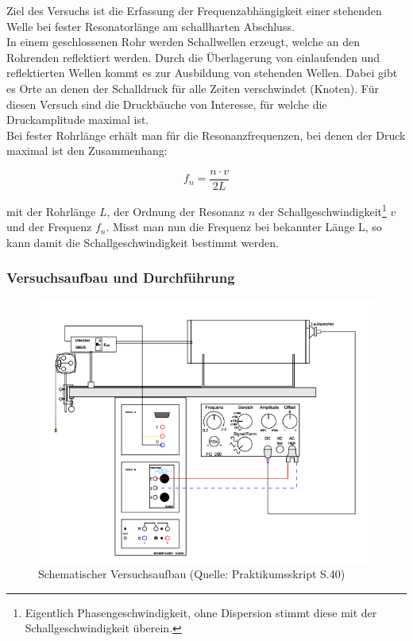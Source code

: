 \documentclass[12pt,a4paper]{article}
\begin{document}
Ziel des Versuchs ist die Erfassung der Frequenzabhängigkeit einer stehenden Welle bei fester Resonatorlänge am schallharten Abschluss.\\
In einem geschlossenen Rohr werden Schallwellen erzeugt, welche an den Rohrenden reflektiert werden. Durch die Überlagerung von einlaufenden und reflektierten Wellen kommt es zur Ausbildung von stehenden Wellen. Dabei gibt es Orte an denen der Schalldruck für alle Zeiten verschwindet (Knoten). Für diesen Versuch sind die Druckbäuche von Interesse, für welche die Druckamplitude maximal ist.\\
Bei fester Rohrlänge erhält man für die Resonanzfrequenzen, bei denen der Druck maximal ist den Zusammenhang:

\begin{equation}
f_n=\frac{n\cdot v}{2L}
\end{equation}

mit der Rohrlänge $L$, der Ordnung der Resonanz $n$ der Schallgeschwindigkeit\footnote{Eigentlich Phasengeschwindigkeit, ohne Dispersion stimmt diese mit der Schallgeschwindigkeit überein.}  $v$ und der Frequenz $f_n$.
Misst man nun die Frequenz bei bekannter Länge L, so kann damit die Schallgeschwindigkeit bestimmt werden.\\

\subsubsection{Versuchsaufbau und Durchführung}

\begin{figure}
	\includegraphics[width=\linewidth]{aufbau}
	\caption[Aufbau]{Schematischer Versuchsaufbau (Quelle: Praktikumsskript S.40)}
	\label{fig:aufbseite40}
\end{figure}
\end{document}
